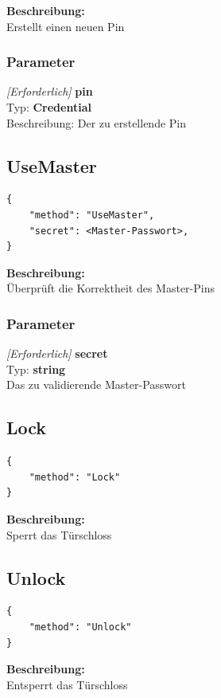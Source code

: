 \textbf{Beschreibung:} \\
Erstellt einen neuen Pin

\subsubsection{Parameter}
\textit{[Erforderlich]} \textbf{pin} \\
Typ: \textbf{Credential} \\
Beschreibung: Der zu erstellende Pin



\subsection{UseMaster}
\begin{lstlisting}
{
    "method": "UseMaster",
    "secret": <Master-Passwort>,
}
\end{lstlisting}

\textbf{Beschreibung:} \\
Überprüft die Korrektheit des Master-Pins

\subsubsection{Parameter}
\textit{[Erforderlich]} \textbf{secret} \\
Typ: \textbf{string} \\
Das zu validierende Master-Passwort 



\subsection{Lock}
\begin{lstlisting}
{
    "method": "Lock"
}
\end{lstlisting}

\textbf{Beschreibung:} \\
Sperrt das Türschloss



\subsection{Unlock}
\begin{lstlisting}
{
    "method": "Unlock"
}
\end{lstlisting}

\textbf{Beschreibung:} \\
Entsperrt das Türschloss


